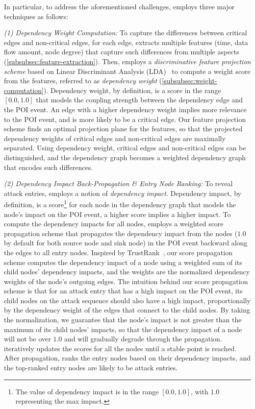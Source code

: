In particular, to address the aforementioned challenges, \tool employs three major techniques as follows:

\emph{(1) Dependency Weight Computation:}
To capture the differences between critical edges and non-critical edges, 
for each edge, \tool extracts multiple features (\eg time, data flow amount, node degree) that capture such differences from multiple aspects (\cref{subsubsec:feature-extraction}).
%
Then, \tool employs a \emph{discriminative feature projection scheme} based on Linear Discriminant Analysis (LDA)~\cite{Mika99fisherdiscriminant} to compute a weight score from the features, referred to as \emph{dependency weight} (\cref{subsubsec:weight-computation}). 
Dependency weight, by definition, is a score in the range $[0.0,1.0]$ that models the coupling strength between the dependency edge and the POI event.
An edge with a higher dependency weight implies more relevance to the POI event, and is more likely to be a critical edge.
Our feature projection scheme finds an optimal projection plane for the features, so that the projected dependency weights of critical edges and non-critical edges are maximally separated.
Using dependency weight, critical edges and non-critical edges can be distinguished, and the dependency graph becomes a weighted dependency graph that encodes such differences. 

\emph{(2) Dependency Impact Back-Propagation \& Entry Node Ranking:} 
To reveal attack entries, \tool employs a notion of \emph{dependency impact}. 
Dependency impact, by definition, is a score\footnote{The value of dependency impact is in the range $[0.0,1.0]$, with $1.0$ representing the max impact.} for each node in the dependency graph that models the node's impact on the POI event, \ie a higher score implies a higher impact.
To compute the dependency impacts for all nodes, \tool employs a weighted score propagation scheme that propagates the dependency impact from the nodes ($1.0$ by default for both source node and sink node) in the POI event backward along the edges to all entry nodes.
Inspired by TrustRank~\cite{Gyongyi:2004:vldb}, our score propagation scheme computes the dependency impact of a node using a weighted sum of its child nodes' dependency impacts, and the weights are the normalized dependency weights of the node's outgoing edges.
The intuition behind our score propagation scheme is that for an attack entry that has a high impact on the POI event, its child nodes on the attack sequence should also have a high impact, proportionally by the dependency weight of the edges that connect to the child nodes.
By taking the normalization, we guarantee that the node's impact is not greater than the maximum of its child nodes' impacts, so that the dependency impact of a node will not be over $1.0$ and will gradually degrade through the propagation.
\tool iteratively updates the scores for all the nodes until a stable point is reached.
After propagation, \tool ranks the entry nodes based on their dependency impacts, and the top-ranked entry nodes are likely to be attack entries.



